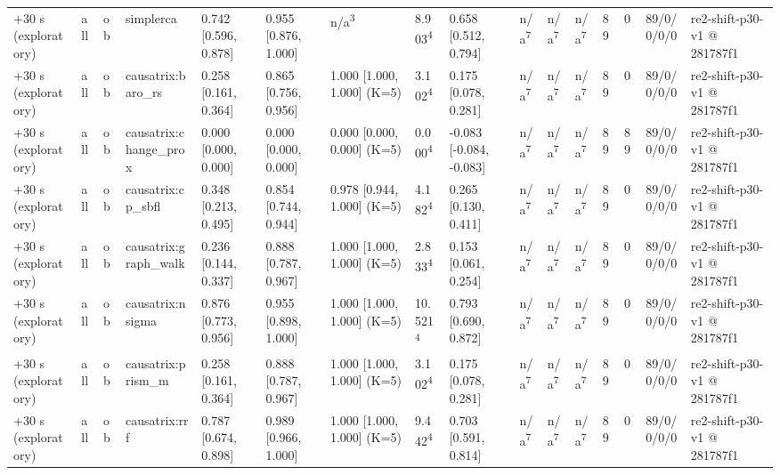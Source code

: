 \begin{table}[t]
\begin{tabular}{llllllllllllllll}
+30 s (exploratory) & all & ob & simplerca & 0.742 [0.596, 0.878] & 0.955 [0.876, 1.000] & n/a\textsuperscript{3} & 8.903\textsuperscript{4} & 0.658 [0.512, 0.794] & n/a\textsuperscript{7} & n/a\textsuperscript{7} & n/a\textsuperscript{7} & 89 & 0 & 89/0/0/0/0 & re2-shift-p30-v1 @ 281787f1 \\
+30 s (exploratory) & all & ob & causatrix:baro\_rs & 0.258 [0.161, 0.364] & 0.865 [0.756, 0.956] & 1.000 [1.000, 1.000] (K=5) & 3.102\textsuperscript{4} & 0.175 [0.078, 0.281] & n/a\textsuperscript{7} & n/a\textsuperscript{7} & n/a\textsuperscript{7} & 89 & 0 & 89/0/0/0/0 & re2-shift-p30-v1 @ 281787f1 \\
+30 s (exploratory) & all & ob & causatrix:change\_prox & 0.000 [0.000, 0.000] & 0.000 [0.000, 0.000] & 0.000 [0.000, 0.000] (K=5) & 0.000\textsuperscript{4} & -0.083 [-0.084, -0.083] & n/a\textsuperscript{7} & n/a\textsuperscript{7} & n/a\textsuperscript{7} & 89 & 89 & 89/0/0/0/0 & re2-shift-p30-v1 @ 281787f1 \\
+30 s (exploratory) & all & ob & causatrix:cp\_sbfl & 0.348 [0.213, 0.495] & 0.854 [0.744, 0.944] & 0.978 [0.944, 1.000] (K=5) & 4.182\textsuperscript{4} & 0.265 [0.130, 0.411] & n/a\textsuperscript{7} & n/a\textsuperscript{7} & n/a\textsuperscript{7} & 89 & 0 & 89/0/0/0/0 & re2-shift-p30-v1 @ 281787f1 \\
+30 s (exploratory) & all & ob & causatrix:graph\_walk & 0.236 [0.144, 0.337] & 0.888 [0.787, 0.967] & 1.000 [1.000, 1.000] (K=5) & 2.833\textsuperscript{4} & 0.153 [0.061, 0.254] & n/a\textsuperscript{7} & n/a\textsuperscript{7} & n/a\textsuperscript{7} & 89 & 0 & 89/0/0/0/0 & re2-shift-p30-v1 @ 281787f1 \\
+30 s (exploratory) & all & ob & causatrix:nsigma & 0.876 [0.773, 0.956] & 0.955 [0.898, 1.000] & 1.000 [1.000, 1.000] (K=5) & 10.521\textsuperscript{4} & 0.793 [0.690, 0.872] & n/a\textsuperscript{7} & n/a\textsuperscript{7} & n/a\textsuperscript{7} & 89 & 0 & 89/0/0/0/0 & re2-shift-p30-v1 @ 281787f1 \\
+30 s (exploratory) & all & ob & causatrix:prism\_m & 0.258 [0.161, 0.364] & 0.888 [0.787, 0.967] & 1.000 [1.000, 1.000] (K=5) & 3.102\textsuperscript{4} & 0.175 [0.078, 0.281] & n/a\textsuperscript{7} & n/a\textsuperscript{7} & n/a\textsuperscript{7} & 89 & 0 & 89/0/0/0/0 & re2-shift-p30-v1 @ 281787f1 \\
+30 s (exploratory) & all & ob & causatrix:rrf & 0.787 [0.674, 0.898] & 0.989 [0.966, 1.000] & 1.000 [1.000, 1.000] (K=5) & 9.442\textsuperscript{4} & 0.703 [0.591, 0.814] & n/a\textsuperscript{7} & n/a\textsuperscript{7} & n/a\textsuperscript{7} & 89 & 0 & 89/0/0/0/0 & re2-shift-p30-v1 @ 281787f1 \\

\end{tabular}
\end{table}
